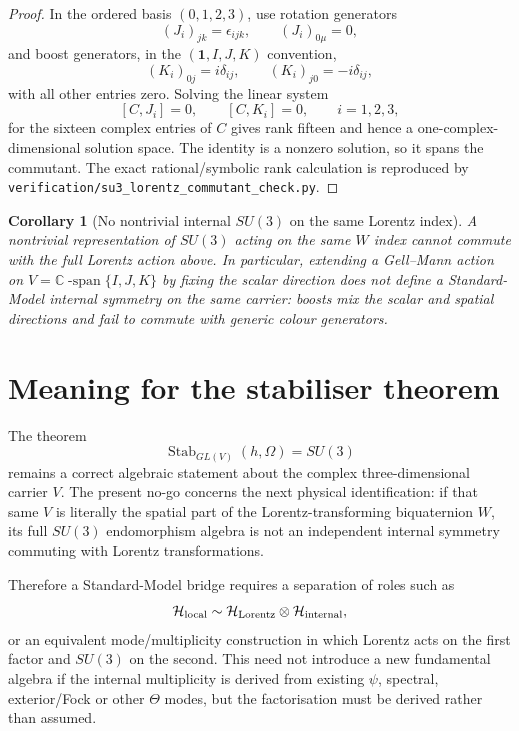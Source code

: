 \documentclass[11pt,a4paper]{article}
\newtheorem{corollary}[theorem]{Corollary}
\begin{document}
\begin{proof}
In the ordered basis $(0,1,2,3)$, use rotation generators
\[
 (J_i)_{jk}=\epsilon_{ijk},\qquad (J_i)_{0\mu}=0,
\]
and boost generators, in the $(\mathbf1,I,J,K)$ convention,
\[
 (K_i)_{0j}=i\delta_{ij},\qquad
 (K_i)_{j0}=-i\delta_{ij},
\]
with all other entries zero.  Solving the linear system
\[
 [C,J_i]=0,\qquad [C,K_i]=0,\qquad i=1,2,3,
\]
for the sixteen complex entries of $C$ gives rank fifteen and hence a
one-complex-dimensional solution space.  The identity is a nonzero solution,
so it spans the commutant.  The exact rational/symbolic rank calculation is
reproduced by
\texttt{verification/su3\_lorentz\_commutant\_check.py}.
\end{proof}

\begin{corollary}[No nontrivial internal $SU(3)$ on the same Lorentz index]
A nontrivial representation of $SU(3)$ acting on the same $W$ index cannot
commute with the full Lorentz action above.  In particular, extending a
Gell--Mann action on
$V=\mathbb C\operatorname{-span}\{I,J,K\}$ by fixing the scalar direction does
not define a Standard-Model internal symmetry on the same carrier: boosts mix
the scalar and spatial directions and fail to commute with generic colour
generators.
\end{corollary}

\section{Meaning for the stabiliser theorem}

The theorem
\[
 \operatorname{Stab}_{GL(V)}(h,\Omega)=SU(3)
\]
remains a correct algebraic statement about the complex three-dimensional
carrier $V$.  The present no-go concerns the next physical identification:
if that same $V$ is literally the spatial part of the Lorentz-transforming
biquaternion $W$, its full $SU(3)$ endomorphism algebra is not an independent
internal symmetry commuting with Lorentz transformations.

Therefore a Standard-Model bridge requires a separation of roles such as
\[
 \mathcal H_{\rm local}
 \sim
 \mathcal H_{\rm Lorentz}\otimes\mathcal H_{\rm internal},
\]
or an equivalent mode/multiplicity construction in which Lorentz acts on the
first factor and $SU(3)$ on the second.  This need not introduce a new
fundamental algebra if the internal multiplicity is derived from existing
$\psi$, spectral, exterior/Fock or other $\Theta$ modes, but the factorisation
must be derived rather than assumed.
\end{document}
